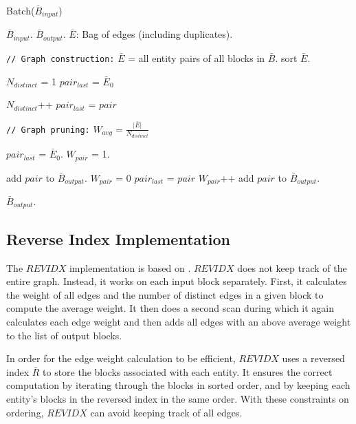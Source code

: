 \documentclass[a4paper,12pt]{article}
\begin{document}
\begin{algorithm}[H]
\caption{{\sc Batch($\bar B_{input}$)}}
\begin{algorithmic}
\REQUIRE $\bar B_{input}$.
\ENSURE $\bar B_{output}$.
\STATE $\bar E$: Bag of edges (including duplicates).

\STATE \texttt{// Graph construction:}
\STATE $\bar E$ = all entity pairs of all blocks in $\bar B$.
\STATE sort $\bar E$.

\STATE $N_{distinct}$ = 1
\STATE $pair_{last}$ = $\bar E_{0}$

    \STATE $N_{distinct}$++
    \STATE $pair_{last}$ = $pair$
  \ENDIF
\ENDFOR

\STATE \texttt{// Graph pruning:}
\STATE $W_{avg} = \frac{\lvert \bar E \rvert}{N_{distinct}}$

\STATE $pair_{last}$ = $\bar E_{0}$.
\STATE $W_{pair}$ = 1.

      \STATE add $pair$ to $\bar B_{output}$.
    \ENDIF
    \STATE $W_{pair}$ = 0
    \STATE $pair_{last}$ = $pair$
  \ENDIF
  \STATE $W_{pair}$++
\ENDFOR
{}
  \STATE add $pair$ to $\bar B_{output}$.
\ENDIF

\RETURN $\bar B_{output}$. \\

\end{algorithmic}
\end{algorithm}

\subsection{Reverse Index Implementation}
The $REVIDX$ implementation is based on \cite{10.1109/TKDE.2013.54}. $REVIDX$ does not keep track of the entire graph. Instead, it works on each input block separately. First, it calculates the weight of all edges and the number of distinct edges in a given block to compute the average weight. It then does a second scan during which it again calculates each edge weight and then adds all edges with an above average weight to the list of output blocks.

In order for the edge weight calculation to be efficient, $REVIDX$ uses a reversed index $\bar R$ to store the blocks associated with each entity. It ensures the correct computation by iterating through the blocks in sorted order, and by keeping each entity's blocks in the reversed index in the same order. With these constraints on ordering, $REVIDX$ can avoid keeping track of all edges.
\end{document}
